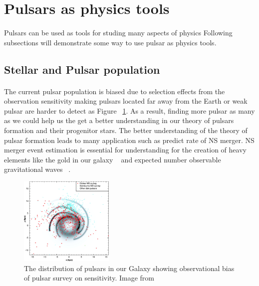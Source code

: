 \documentclass[thesis_msc.tex]{subfiles}
\begin{document}
\section{Pulsars as physics tools}
    \paragraph{} Pulsars can be used as tools for studing many aspects of physics %
    Following subsections will demonstrate some way to use pulsar as physics tools.  

    \subsection{Stellar and Pulsar population} 
    \paragraph{} The current pulsar population is biased due to selection effects from the observation sensitivity making pulsars located far away from the Earth or weak pulsar are harder to detect as Figure ~\ref{pdist}. As a result, finding more pulsar as many as we could help us the get a better understanding in our theory of pulsars formation and their progenitor stars. The better understanding of the theory of pulsar formation leads to many application such as predict rate of NS merger. NS merger event estimation is essential for understanding for the creation of heavy elements like the gold in our galaxy ~\citep{Thielemann:2017acv} and expected number observable gravitational waves ~\citep{0034-4885-72-7-076901}.
        \begin{figure}[h] \centering
\includegraphics[width=0.4\textwidth]{figures/F1_large.jpg}
\caption{The distribution of pulsars in our Galaxy showing observational bias of pulsar survey on sensitivity. Image from \citep{Manchester542}  }
\label{pdist}
\end{figure}
\end{document}
